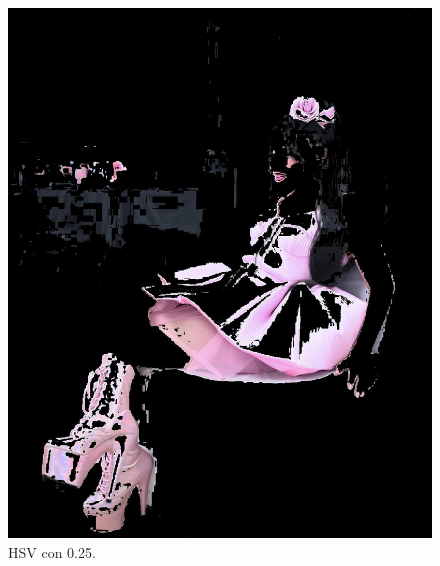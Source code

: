 \documentclass[11pt, letterpaper]{article}
\begin{document}
\begin{figure}[h!]
\begin{minipage}{0.4\textwidth}
		\includegraphics[width=\textwidth]{IMG/R23.jpg}
		\caption*{HSV con 0.25.}
	\end{minipage}
	
	\vspace{1em} %
	

\end{figure}
\end{document}

